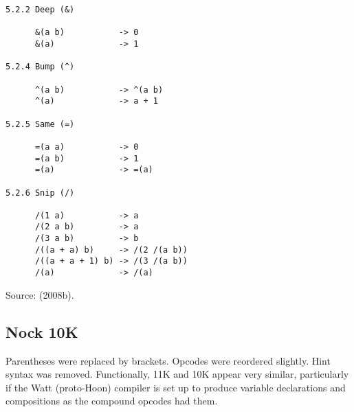 \documentclass[twoside]{article}
\begin{document}
\begin{lstlisting}[label=lst:nock11k,caption={Nock 11K, 25 May 2008.},style=listingcode]
5.2.2 Deep (&)

      &(a b)           -> 0
      &(a)             -> 1

5.2.4 Bump (^)

      ^(a b)           -> ^(a b)
      ^(a)             -> a + 1

5.2.5 Same (=)

      =(a a)           -> 0
      =(a b)           -> 1
      =(a)             -> =(a)

5.2.6 Snip (/)

      /(1 a)           -> a
      /(2 a b)         -> a
      /(3 a b)         -> b
      /((a + a) b)     -> /(2 /(a b))
      /((a + a + 1) b) -> /(3 /(a b))
      /(a)             -> /(a)
\end{lstlisting}

Source:   (2008b). %

\subsection{Nock 10K}

Parentheses were replaced by brackets.  Opcodes were reordered slightly.  Hint syntax was removed.  Functionally, 11K and 10K appear very similar, particularly if the Watt (proto-Hoon) compiler is set up to produce variable declarations and compositions as the compound opcodes had them.
\end{document}
